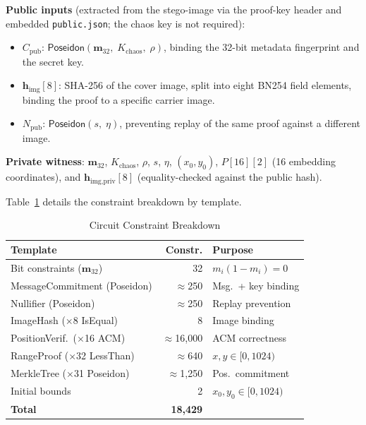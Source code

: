 \documentclass{jstarticle}
\begin{document}
\textbf{Public inputs} (extracted from the stego-image via the proof-key header and embedded \texttt{public.json}; the chaos key is not required):
\begin{itemize}
  \item $C_{\text{pub}}$: $\mathsf{Poseidon}(\mathbf{m}_{32},\; K_{\text{chaos}},\; \rho)$,
    binding the 32-bit metadata fingerprint and the secret key.
  \item $\mathbf{h}_{\text{img}}[8]$: SHA-256 of the cover image, split into
    eight BN254 field elements, binding the proof to a specific carrier image.
  \item $N_{\text{pub}}$: $\mathsf{Poseidon}(s,\; \eta)$, preventing replay
    of the same proof against a different image.
\end{itemize}

\textbf{Private witness}: $\mathbf{m}_{32}$, $K_{\text{chaos}}$, $\rho$,
$s$, $\eta$, $(x_0, y_0)$, $P[16][2]$ (16 embedding coordinates), and
$\mathbf{h}_{\text{img,priv}}[8]$ (equality-checked against the public hash).

Table~\ref{tab:circuit} details the constraint breakdown by template.

\begin{table}[htbp]
\centering\small
\caption{Circuit Constraint Breakdown}
\label{tab:circuit}
\begin{tabularx}{\columnwidth}{@{}X r l@{}}
\toprule
\textbf{Template} & \textbf{Constr.} & \textbf{Purpose} \\
\midrule
Bit constraints ($\mathbf{m}_{32}$) & 32 & $m_i(1{-}m_i)=0$ \\
MessageCommitment (Poseidon) & $\approx$250 & Msg.\ + key binding \\
Nullifier (Poseidon) & $\approx$250 & Replay prevention \\
ImageHash ($\times$8 IsEqual) & 8 & Image binding \\
PositionVerif.\ ($\times$16 ACM) & $\approx$16,000 & ACM correctness \\
RangeProof ($\times$32 LessThan) & $\approx$640 & $x,y\in[0,1024)$ \\
MerkleTree ($\times$31 Poseidon) & $\approx$1,250 & Pos.\ commitment \\
Initial bounds & 2 & $x_0,y_0\in[0,1024)$ \\
\midrule
\textbf{Total} & \textbf{18,429} & \\
\bottomrule
\end{tabularx}
\end{table}
\end{document}
